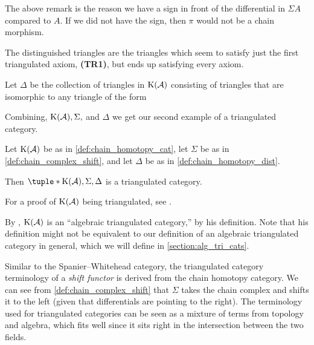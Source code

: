 The above remark is the reason we have a sign in front of the differential in \( \Sigma A \) compared to \( A \). If we did not have the sign, then \( \pi \) would not be a chain morphism.

The distinguished triangles are the triangles which seem to satisfy just the first triangulated axiom, {\bf (TR1)}, but ends up satisfying every axiom.

\begin{definition}
    \label{def:chain_homotopy_dist}
    Let \( \Delta \) be the collection of triangles in \( \operatorname{K}({\mathcal{A}}) \) consisting of triangles that are isomorphic to any triangle of the form

    \begin{center}
    \end{center}
\end{definition}

Combining, \( \operatorname{K}({\mathcal{A}}), \Sigma, \) and \( \Delta \) we get our second example of a triangulated category.

\begin{example}
    Let \( \operatorname{K}({\mathcal{A}}) \) be as in \autoref{def:chain_homotopy_cat}, let \( \Sigma \) be as in \autoref{def:chain_complex_shift}, and let \( \Delta \) be as in \autoref{def:chain_homotopy_dist}.

    Then \( \tuple*{\K(\Ac), \Sigma, \Delta} \) is a triangulated category.
\end{example}
For a proof of \( \operatorname{K}({\mathcal{A}}) \) being triangulated, see \cite[Proposition 3.5.25]{Zimmermann_2014}.

By \cite[Section 7.5]{Krause_2007}, \( \operatorname{K}({\mathcal{A}}) \) is an ``algebraic triangulated category,'' by his definition. Note that his definition might not be equivalent to our definition of an algebraic triangulated category in general, which we will define in \autoref{section:alg_tri_cats}.

Similar to the Spanier--Whitehead category, the triangulated category terminology of a \emph{shift functor} is derived from the chain homotopy category. We can see from \autoref{def:chain_complex_shift} that \( \Sigma \) takes the chain complex and shifts it to the left (given that differentials are pointing to the right). The terminology used for triangulated categories can be seen as a mixture of terms from topology and algebra, which fits well since it sits right in the intersection between the two fields.
